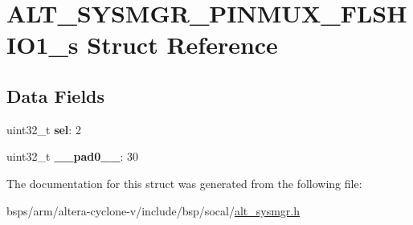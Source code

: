 \hypertarget{structALT__SYSMGR__PINMUX__FLSHIO1__s}{}\section{A\+L\+T\+\_\+\+S\+Y\+S\+M\+G\+R\+\_\+\+P\+I\+N\+M\+U\+X\+\_\+\+F\+L\+S\+H\+I\+O1\+\_\+s Struct Reference}
\label{structALT__SYSMGR__PINMUX__FLSHIO1__s}
\subsection*{Data Fields}
\begin{DoxyCompactItemize}
\item 
\mbox{\label{structALT__SYSMGR__PINMUX__FLSHIO1__s_a7b02fd6817532ba4055bc7087f8ebed9}} 
uint32\+\_\+t {\bfseries sel}\+: 2
\item 
\mbox{\label{structALT__SYSMGR__PINMUX__FLSHIO1__s_ac9cd395417e7da975cf99da8f498a73e}} 
uint32\+\_\+t {\bfseries \+\_\+\+\_\+pad0\+\_\+\+\_\+}\+: 30
\end{DoxyCompactItemize}


The documentation for this struct was generated from the following file\+:\begin{DoxyCompactItemize}
\item 
bsps/arm/altera-\/cyclone-\/v/include/bsp/socal/\mbox{\hyperlink{alt__sysmgr_8h}{alt\+\_\+sysmgr.\+h}}\end{DoxyCompactItemize}
